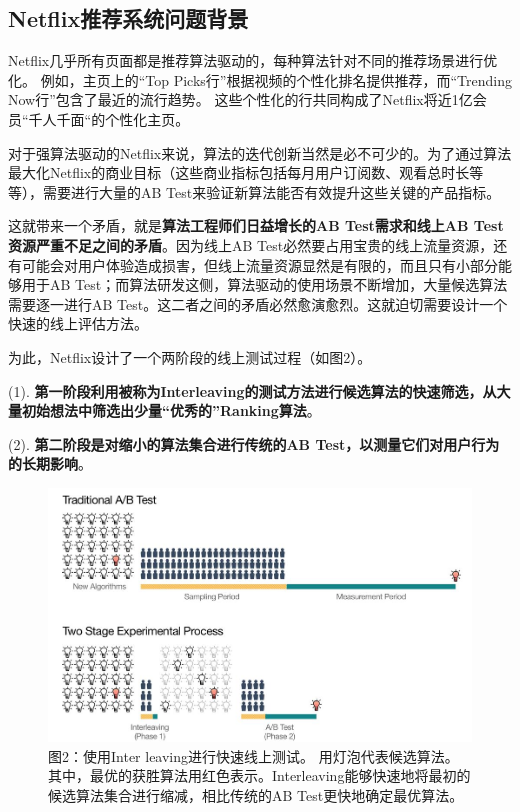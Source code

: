 \documentclass[12pt]{article}
\begin{document}
\subsection{Netflix推荐系统问题背景}
Netflix几乎所有页面都是推荐算法驱动的，每种算法针对不同的推荐场景进行优化。 例如，主页上的“Top Picks行”根据视频的个性化排名提供推荐，而“Trending Now行”包含了最近的流行趋势。 这些个性化的行共同构成了Netflix将近1亿会员“千人千面“的个性化主页。

对于强算法驱动的Netflix来说，算法的迭代创新当然是必不可少的。为了通过算法最大化Netflix的商业目标（这些商业指标包括每月用户订阅数、观看总时长等等），需要进行大量的AB Test来验证新算法能否有效提升这些关键的产品指标。

这就带来一个矛盾，就是\textbf{算法工程师们日益增长的AB Test需求和线上AB Test资源严重不足之间的矛盾}。因为线上AB Test必然要占用宝贵的线上流量资源，还有可能会对用户体验造成损害，但线上流量资源显然是有限的，而且只有小部分能够用于AB Test；而算法研发这侧，算法驱动的使用场景不断增加，大量候选算法需要逐一进行AB Test。这二者之间的矛盾必然愈演愈烈。这就迫切需要设计一个快速的线上评估方法。

为此，Netflix设计了一个两阶段的线上测试过程（如图2）。

(1). \textbf{第一阶段利用被称为Interleaving的测试方法进行候选算法的快速筛选，从大量初始想法中筛选出少量“优秀的”Ranking算法}。

(2). \textbf{第二阶段是对缩小的算法集合进行传统的AB Test，以测量它们对用户行为的长期影响}。

\begin{figure}[H]
    \centering
    \includegraphics[width=1\textwidth]{fig/Netflix_Interleaving_Idea.jpg}
    \caption*{图2：使用Inter leaving进行快速线上测试。 用灯泡代表候选算法。 其中，最优的获胜算法用红色表示。Interleaving能够快速地将最初的候选算法集合进行缩减，相比传统的AB Test更快地确定最优算法。}
\end{figure}
\end{document}
